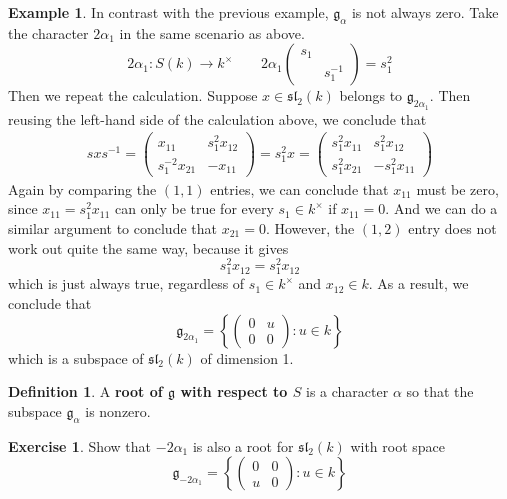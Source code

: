 \documentclass[12pt]{article}
\theoremstyle{definition}
\newtheorem{definition}[theorem]{Definition}
\newtheorem{example}[theorem]{Example}
\newtheorem{exercise}[theorem]{Exercise}
\newcommand{\lb}{\left\{}
\newcommand{\rb}{\right\}}
\newcommand{\tbf}{\textbf}
\newcommand{\inv}{^{-1}}
\newcommand{\frakg}{\mathfrak{g}}
\newcommand{\fraksl}{\mathfrak{sl}}
\begin{document}
\begin{example}
In contrast with the previous example, $\frakg_\alpha$ is not always zero. Take the character $2 \alpha_1$ in the same scenario as above.
\[
	2\alpha_1:S(k) \to k^\times \qquad 2\alpha_1\begin{pmatrix}
			s_1 \\
			& s_1 \inv
		\end{pmatrix}
		= s_1^2
\]
Then we repeat the calculation. Suppose $x \in \fraksl_2(k)$ belongs to $\frakg_{2\alpha_1}$. Then reusing the left-hand side of the calculation above, we conclude that
\begin{align*}
	sxs \inv = \begin{pmatrix}
		x_{11} & s_1^2 x_{12} \\
		s_1^{-2} x_{21} & - x_{11}
	\end{pmatrix}
	= s_1^2 x =
	\begin{pmatrix}
		s_1^2 x_{11} &  s_1^2 x_{12} \\
		s_1^2 x_{21} & - s_1^2 x_{11}
	\end{pmatrix} 
\end{align*}
Again by comparing the $(1,1)$ entries, we can conclude that $x_{11}$ must be zero, since $x_{11} = s_1^2 x_{11}$ can only be true for every $s_1 \in k^\times$ if $x_{11} = 0$. And we can do a similar argument to conclude that $x_{21} = 0$. However, the $(1,2)$ entry does not work out quite the same way, because it gives
\[
	s_1^2 x_{12} = s_1^2 x_{12}
\]
which is just always true, regardless of $s_1 \in k^\times$ and $x_{12} \in k$. As a result, we conclude that
\[
	\frakg_{2\alpha_1} =
	\lb
	\begin{pmatrix}
		0 & u \\
		0 & 0 
	\end{pmatrix}
	: u \in k
	\rb
\]
which is a subspace of $\fraksl_{2}(k)$ of dimension 1.
\end{example}

\begin{definition}
A \tbf{root of $\frakg$ with respect to $S$} is a character $\alpha$ so that the subspace $\frakg_\alpha$ is nonzero.
\end{definition}

\begin{exercise}
Show that $-2\alpha_1$ is also a root for $\fraksl_2(k)$ with root space
\[
	\frakg_{-2\alpha_1} =
	\lb
	\begin{pmatrix}
		0 & 0 \\
		u & 0 
	\end{pmatrix}
	: u \in k
	\rb
\]
\end{exercise}
\end{document}
